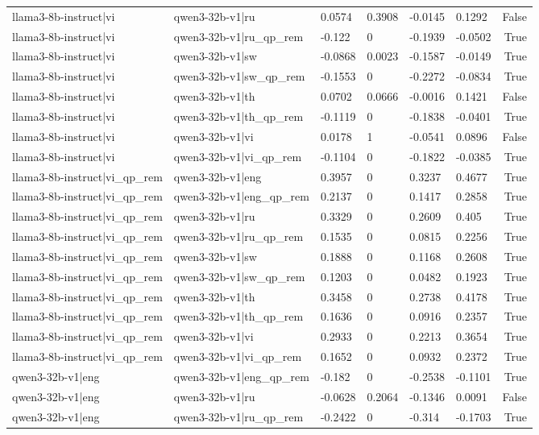 \begin{table}
\begin{tabular}{llllllr}
llama3-8b-instruct|vi & qwen3-32b-v1|ru & 0.0574 & 0.3908 & -0.0145 & 0.1292 & False \\
llama3-8b-instruct|vi & qwen3-32b-v1|ru_qp_rem & -0.122 & 0 & -0.1939 & -0.0502 & True \\
llama3-8b-instruct|vi & qwen3-32b-v1|sw & -0.0868 & 0.0023 & -0.1587 & -0.0149 & True \\
llama3-8b-instruct|vi & qwen3-32b-v1|sw_qp_rem & -0.1553 & 0 & -0.2272 & -0.0834 & True \\
llama3-8b-instruct|vi & qwen3-32b-v1|th & 0.0702 & 0.0666 & -0.0016 & 0.1421 & False \\
llama3-8b-instruct|vi & qwen3-32b-v1|th_qp_rem & -0.1119 & 0 & -0.1838 & -0.0401 & True \\
llama3-8b-instruct|vi & qwen3-32b-v1|vi & 0.0178 & 1 & -0.0541 & 0.0896 & False \\
llama3-8b-instruct|vi & qwen3-32b-v1|vi_qp_rem & -0.1104 & 0 & -0.1822 & -0.0385 & True \\
llama3-8b-instruct|vi_qp_rem & qwen3-32b-v1|eng & 0.3957 & 0 & 0.3237 & 0.4677 & True \\
llama3-8b-instruct|vi_qp_rem & qwen3-32b-v1|eng_qp_rem & 0.2137 & 0 & 0.1417 & 0.2858 & True \\
llama3-8b-instruct|vi_qp_rem & qwen3-32b-v1|ru & 0.3329 & 0 & 0.2609 & 0.405 & True \\
llama3-8b-instruct|vi_qp_rem & qwen3-32b-v1|ru_qp_rem & 0.1535 & 0 & 0.0815 & 0.2256 & True \\
llama3-8b-instruct|vi_qp_rem & qwen3-32b-v1|sw & 0.1888 & 0 & 0.1168 & 0.2608 & True \\
llama3-8b-instruct|vi_qp_rem & qwen3-32b-v1|sw_qp_rem & 0.1203 & 0 & 0.0482 & 0.1923 & True \\
llama3-8b-instruct|vi_qp_rem & qwen3-32b-v1|th & 0.3458 & 0 & 0.2738 & 0.4178 & True \\
llama3-8b-instruct|vi_qp_rem & qwen3-32b-v1|th_qp_rem & 0.1636 & 0 & 0.0916 & 0.2357 & True \\
llama3-8b-instruct|vi_qp_rem & qwen3-32b-v1|vi & 0.2933 & 0 & 0.2213 & 0.3654 & True \\
llama3-8b-instruct|vi_qp_rem & qwen3-32b-v1|vi_qp_rem & 0.1652 & 0 & 0.0932 & 0.2372 & True \\
qwen3-32b-v1|eng & qwen3-32b-v1|eng_qp_rem & -0.182 & 0 & -0.2538 & -0.1101 & True \\
qwen3-32b-v1|eng & qwen3-32b-v1|ru & -0.0628 & 0.2064 & -0.1346 & 0.0091 & False \\
qwen3-32b-v1|eng & qwen3-32b-v1|ru_qp_rem & -0.2422 & 0 & -0.314 & -0.1703 & True \\

\end{tabular}
\end{table}
